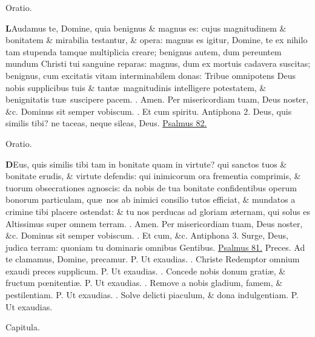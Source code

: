 \documentclass[letter,11pt]{book}
\makeatletter
\DeclareRobustCommand{\Vbar}{\vers@resp{-0.1em}{V}}
\DeclareRobustCommand{\Rbar}{\vers@resp{0pt}{R}}
\newcommand{\vers@resp@sym}{\raisebox{0.2ex}{\rotatebox[origin=c]{-20}{$\m@th\rceil$}}}
\newcommand{\vers@resp}[2]{%
  {\ooalign{\hidewidth\kern#1\vers@resp@sym\hidewidth\cr#2\cr}}%
}%
\def\P{\color{Red} P. \color{black}}
\def\V{\color{Red} \Vbar . \color{black}}
\def\R{\color{Red} \Rbar . \color{black}}
\makeatother
\begin{document}
\begin{multicols*}{2}
\vspace{-.5em} \begin{center} \color{Red} Oratio. \color{black} \end{center} \vspace{-.5em}
\lettrine[lines=2]{\bfseries \color{Red} L}{}Audamus te, Domine, quia benignus \& magnus es: cujus magnitudinem \& bonitatem \& mirabilia testantur, \& opera: magnus es igitur, Domine, te ex nihilo tam stupenda tamque multiplicia creare; benignus autem, dum pereuntem mundum Christi tui sanguine reparas: magnus, dum ex mortuis cadavera suscitas; benignus, cum excitatis vitam interminabilem donas: Tribue omnipotens Deus nobis supplicibus tuis \& tant\ae \ magnitudinis intelligere potestatem, \& benignitatis tu\ae \ suscipere pacem. \R Amen. Per misericordiam tuam, Deus noster, \&c. Dominus sit semper vobiscum. \R Et cum spiritu.
\newline \color{Red} Antiphona 2. \color{black} Deus, quis similis tibi? ne taceas, neque sileas, Deus. \color{Red} \hyperlink{ps82}{Psalmus 82.} \color{black}
\vspace{-.5em} \begin{center} \color{Red} Oratio. \color{black} \end{center} \vspace{-.5em}
\lettrine[lines=2]{\bfseries \color{Red} D}{}Eus, quis similis tibi tam in bonitate quam in virtute? qui sanctos tuos \& bonitate erudis, \& virtute defendis: qui inimicorum ora frementia comprimis, \& tuorum obsecrationes agnoscis: da nobis de tua bonitate confidentibus operum bonorum particulam, qu\ae \ nos ab inimici consilio tutos efficiat, \& mundatos a crimine tibi placere ostendat: \& tu nos perducas ad gloriam \ae ternam, qui solus es Altissimus super omnem terram. \R Amen. Per misericordiam tuam, Deus noster, \&c. Dominus sit semper vobiscum. \R Et cum, \&c.
\newline \color{Red} Antiphona 3. \color{black} Surge, Deus, judica terram: quoniam tu dominaris omnibus Gentibus. \color{Red} \hyperlink{ps81}{Psalmus 81.} \color{black}
\newline \color{Red} Preces. \color{black} Ad te clamamus, Domine, precamur. \P Ut exaudias. \V Christe Redemptor omnium exaudi preces supplicum. \P Ut exaudias. \V Concede nobis donum grati\ae , \& fructum p\oe nitenti\ae . \P Ut exaudias. \V Remove a nobis gladium, famem, \& pestilentiam. \P Ut exaudias. \V Solve delicti piaculum, \& dona indulgentiam. \P Ut exaudias.
\vspace{-.5em} \begin{center} \color{Red} Capitula. \color{black} \end{center} \vspace{-.5em}

\end{multicols*}
\end{document}
